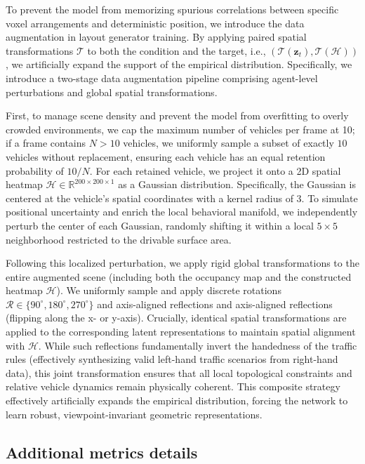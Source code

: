 To prevent the model from memorizing spurious correlations between specific voxel arrangements and deterministic position, we introduce the data augmentation in layout generator training. By applying paired spatial transformations $\mathcal{T}$ to both the condition and the target, i.e., $(\mathcal{T}(\mathbf{z}_{t}), \mathcal{T}(\mathcal{H}))$, we artificially expand the support of the empirical distribution. Specifically, we introduce a two-stage data augmentation pipeline comprising agent-level perturbations and global spatial transformations. 

First, to manage scene density and prevent the model from overfitting to overly crowded environments, we cap the maximum number of vehicles per frame at 10; if a frame contains $N > 10$ vehicles, we uniformly sample a subset of exactly $10$ vehicles without replacement, ensuring each vehicle has an equal retention probability of $10/N$. For each retained vehicle, we project it onto a 2D spatial heatmap $\mathcal{H} \in \mathbb{R}^{200 \times 200 \times 1}$ as a Gaussian distribution. Specifically, the Gaussian is centered at the vehicle's spatial coordinates with a kernel radius of 3. To simulate positional uncertainty and enrich the local behavioral manifold, we independently perturb the center of each Gaussian, randomly shifting it within a local $5 \times 5$ neighborhood restricted to the drivable surface area. 

Following this localized perturbation, we apply rigid global transformations to the entire augmented scene (including both the occupancy map and the constructed heatmap $\mathcal{H}$). We uniformly sample and apply discrete rotations $\mathcal{R} \in \{90^\circ, 180^\circ, 270^\circ\}$ and axis-aligned reflections and axis-aligned reflections (flipping along the x- or y-axis). Crucially, identical spatial transformations are applied to the corresponding latent representations to maintain spatial alignment with $\mathcal{H}$. While such reflections fundamentally invert the handedness of the traffic rules (effectively synthesizing valid left-hand traffic scenarios from right-hand data), this joint transformation ensures that all local topological constraints and relative vehicle dynamics remain physically coherent. This composite strategy effectively artificially expands the empirical distribution, forcing the network to learn robust, viewpoint-invariant geometric representations.

\subsection{Additional metrics details}
\label{sec:appendix_training_details}

